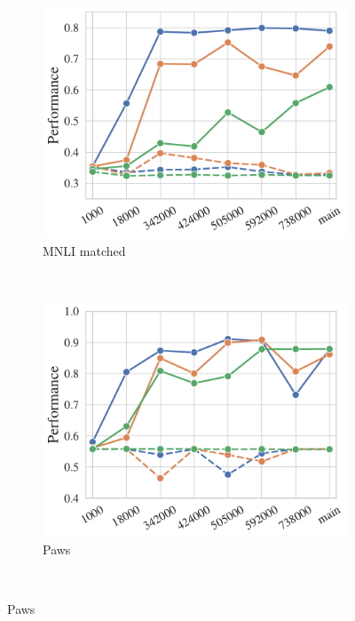 

\begin{figure}[t!]
    \centering
    \begin{subfigure}[b]{0.4\textwidth}
    \includegraphics[width=\the\columnwidth]{figures/fig_files/task_format/task_format_evalmnli_matched-trainmnli.pdf}
        \caption{MNLI matched}
    \end{subfigure}%
    ~ 
    \begin{subfigure}[b]{0.4\textwidth}
    \includegraphics[width=\the\columnwidth]{figures/fig_files/task_format/task_format_evalpaws-trainpaws.pdf}
        \caption{Paws}
    \end{subfigure}%
    \\

\end{figure}
